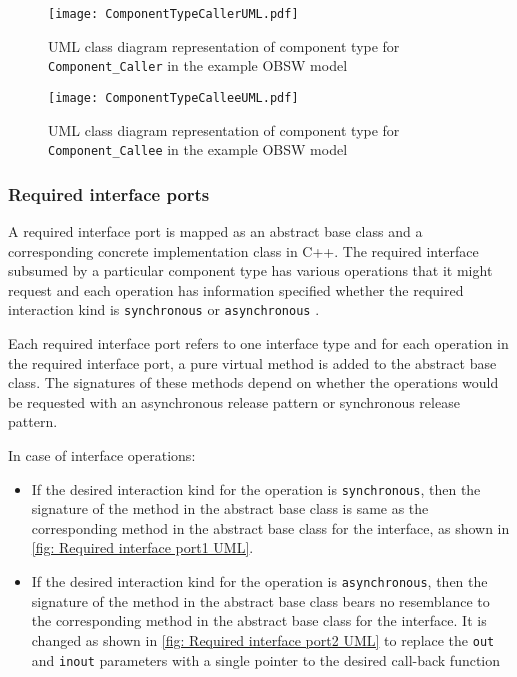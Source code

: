 \begin{figure}[h]
	\centering
	\texttt{[image: ComponentTypeCallerUML.pdf]}
	\caption{UML class diagram representation of component type for \texttt{Component\allowbreak\_Caller} in the example OBSW model}
	\label{fig: Component type Caller UML}
\end{figure} 

\begin{figure}[h]
	\centering
	\texttt{[image: ComponentTypeCalleeUML.pdf]}
	\caption{UML class diagram representation of component type for \texttt{Component\allowbreak\_Callee} in the example OBSW model}
	\label{fig: Component type Callee UML}
\end{figure} 

\subsubsection{\textbf{Required interface ports}}
A required interface port is mapped as an abstract base class and a corresponding concrete implementation class in C++. The required interface subsumed by a particular component type has various operations that it might request and each operation has information specified whether the required interaction kind is \texttt{synchronous} or \texttt{asynchronous} \cite{SpecMetamodel}\cite{CompBasedProcess}. 

Each required interface port refers to one interface type and for each operation in the required interface port, a pure virtual method is added to the abstract base class. The signatures of these methods depend on whether the operations would be requested with an asynchronous release pattern or synchronous release pattern.

In case of interface operations:
\begin{itemize}
\item If the desired interaction kind for the operation is \texttt{synchronous}, then the signature of the method in the abstract base class is same as the corresponding method in the abstract base class for the interface, as shown in \cref{fig: Required interface port1 UML}.
\item If the desired interaction kind for the operation is \texttt{asynchronous}, then the signature of the method in the abstract base class bears no resemblance to the corresponding method in the abstract base class for the interface. It is changed as shown in \cref{fig: Required interface port2 UML} to replace the \texttt{out} and \texttt{inout} parameters with a single pointer to the desired call-back function 
\end{itemize}

